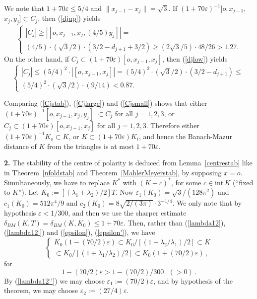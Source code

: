 \documentclass[12pt]{article}
\begin{document}
We note that $1+70\varepsilon\leq 5/4$ and $\|x_{j-1}-x_j\|=\sqrt{3}$.
If $(1+70\varepsilon)^{-1}[o,x_{j-1},$ $x_j,y_j]\subset C_j$, then
(\ref{djup}) yields
\begin{equation}
\label{Cjlarge}
\begin{cases}
|C_j|\geq |[o,x_{j-1},x_j,(4/5)y_j]|= \\
(4/5)\cdot (\sqrt{3}/2) \cdot (3/2-d_{j+1}+3/2)\geq 
(2\sqrt{3}/5)\cdot48/26>1.27.
\end{cases}
\end{equation}
On the other hand, if $C_j\subset(1+70\varepsilon)[o,x_{j-1},x_j]$,
then (\ref{djlow}) yields
\begin{equation}
\label{Cjsmall}
\begin{cases}
|C_j|\leq (5/4)^2 \cdot |[o,x_{j-1},x_j]|=
(5/4)^2 \cdot ({\sqrt{3}}/2) \cdot (3/2-d_{j+1})\leq \\
(5/4)^2 \cdot ({\sqrt{3}}/2)\cdot (9/14)<0.87.
\end{cases}
\end{equation}

Comparing (\ref{Cjstab}), (\ref{Cjlarge}) and (\ref{Cjsmall})
shows that either $(1+70\varepsilon)^{-1}[o,x_{j-1},x_j,y_j]$ 
\newline
$\subset C_j$
for all $j=1,2,3$, or
$C_j\subset(1+70\varepsilon)[o,x_{j-1},x_j]$ for all $j=1,2,3$.
Therefore either $(1+70\varepsilon)^{-1}K_o\subset K$,
or $K \subset (1+70\varepsilon)K_i$, and
hence the Banach-Mazur distance of $K$ from the triangles
is at most $1+70\varepsilon$.

{\bf{2.}}
The stability of the centre of polarity is deduced from 
Lemma~\ref{centrestab}
like in Theorem~\ref{nfoldstab} and 
Theorem~\ref{MahlerMeyerstab}, by supposing $x=o$. 
Simultaneously,
we have to replace $K^*$ with $(K-c)^*$, for some $c \in {\text{int}}\,K$
(``fixed to $K$''). Let $K_0:=[(\lambda _1 + \lambda _2)/2]T$.
Now 
$\varepsilon _1 (K_0)=\sqrt{3}/(128 \pi ^2)$ and $c_1(K_0)=512 \pi ^4 /9$
and $c_2(K_0)=8{\sqrt{2/(3 \pi )}} \cdot 3^{-1/4}$.
We only note that 
by hypothesis $\varepsilon < 1/300$, 
and then
we use the sharper estimate
$\delta _{BM}(K,T) = \delta _{BM}(K, K_0) \le 1 + 70 \varepsilon $.
Then, rather than (\ref{lambda12}), (\ref{lambda12'}) and 
(\ref{epsilon}), (\ref{epsilon'}), we have 
\begin{equation}
\label{lambda12''}
\begin{cases}
K_0 \left( 1-(70/2) \varepsilon \right) 
\subset K_0/[(1+\lambda _2 / \lambda _1)/2]
\subset K \\
\subset K_0/[(1+\lambda _1 / \lambda _2 )/2] \subset K_0 \left( 1+(70/2)
\varepsilon \right) \,,
\end{cases}
\end{equation}
for
\begin{equation}
\label{epsilon''}
1-(70/2) \varepsilon > 1-(70/2)/300 \,\,\,\,(>0)\,.
\end{equation}
By (\ref{lambda12''}) we may choose $\varepsilon _1:=(70/2) \varepsilon $, and
by hypothesis of the theorem, we may choose $\varepsilon _2 
:=(27/4) \varepsilon $.
\end{document}
